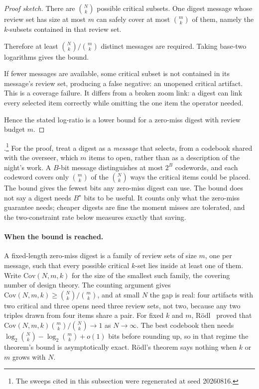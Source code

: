 \documentclass[11pt,a4paper]{article}
\theoremstyle{definition}
\theoremstyle{plain}
\begin{document}
\begin{proof}[Proof sketch]
\setlength{\parskip}{4pt plus 1pt}
There are $\binom Nk$ possible critical subsets. One digest message whose review
set has size at most $m$ can safely cover at most $\binom mk$ of them, namely the
$k$-subsets contained in that review set.

Therefore at least
$\binom Nk/\binom mk$ distinct messages are required. Taking base-two logarithms
gives the bound.

If fewer messages are available, some critical subset is not
contained in its message's review set, producing a
false negative: an unopened critical artifact. This is a coverage failure.
It differs from a broken zoom link: a digest can link every selected item
correctly while omitting the one item the operator needed.

Hence the stated log-ratio is a lower bound for a
zero-miss digest with review budget $m$.
\end{proof}

\noindent\Verified.\footnote{The sweeps cited in this subsection were regenerated at seed
20260816.} For the proof, treat a digest as a \emph{message} that selects, from a
codebook shared with the overseer, which $m$ items to open, rather than as a
description of the night's work. A $B$-bit message distinguishes at most $2^B$
codewords, and each codeword covers only $\binom{m}{k}$ of the $\binom{N}{k}$ ways
the critical items could be placed. The bound gives the fewest bits
any zero-miss digest can use. The bound does not say
a digest needs $B^\star$ bits to be useful. It counts only what the zero-miss
guarantee needs; cheaper digests are fine the moment misses are tolerated, and
the two-constraint rate below measures exactly that saving.

\paragraph{When the bound is reached.} A fixed-length zero-miss digest is a
family of review sets of size $m$, one per message, such that every possible
critical $k$-set lies inside at least one of them. Write $\mathrm{Cov}(N,m,k)$
for the size of the smallest such family, the covering number of design theory. The counting
argument gives $\mathrm{Cov}(N,m,k)\ge\binom Nk/\binom mk$, and at small $N$ the
gap is real: four artifacts with two critical and three opens need three review
sets, not two, because any two triples drawn from four items share a pair. For
fixed $k$ and $m$, Rödl~ proved that
$\mathrm{Cov}(N,m,k)\binom mk/\binom Nk\to1$ as $N\to\infty$. The best codebook
then needs $\log_2\binom Nk-\log_2\binom mk+o(1)$ bits before rounding up, so in
that regime the theorem's bound is asymptotically exact. Rödl's theorem says
nothing when $k$ or $m$ grows with $N$.
\end{document}
